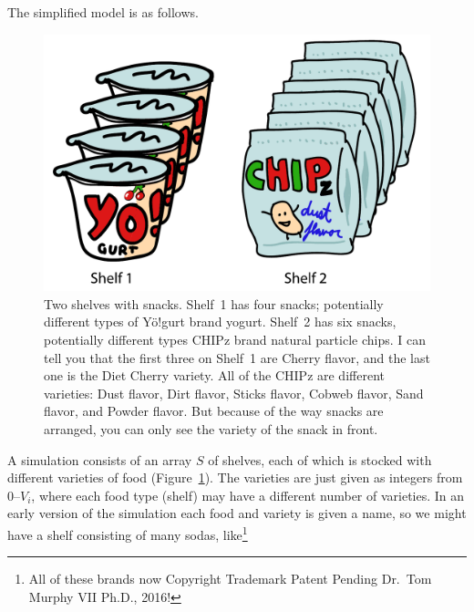 \documentclass[twocolumn]{article}
\begin{document}
The simplified model is as follows.

\begin{figure}[ht]
\begin{center}
\includegraphics[width=\linewidth]{shelves}
\end{center}\vspace{-0.1in}
\caption{Two shelves with snacks. Shelf~1 has four snacks; potentially different types of Y\"o!gurt brand yogurt. Shelf~2 has six snacks, potentially different types CHIPz brand natural particle chips. I can tell you that the first three on Shelf~1 are Cherry flavor, and the last one is the Diet Cherry variety. All of the CHIPz are different varieties: Dust flavor, Dirt flavor, Sticks flavor, Cobweb flavor, Sand flavor, and Powder flavor. But because of the way snacks are arranged, you can only see the variety of the snack in front.} \label{figure:shelves}
\end{figure}

A simulation consists of an array $S$ of shelves, each of which is stocked with different varieties of food (Figure~\ref{figure:shelves}). The varieties are just given as integers from 0--$V_i$, where each food type (shelf) may have a different number of varieties. In an early version of the simulation each food and variety is given a name, so we might have a shelf consisting of many sodas, like\footnote{All of these brands now Copyright Trademark Patent Pending Dr.~Tom Murphy VII Ph.D., 2016!}
\end{document}
